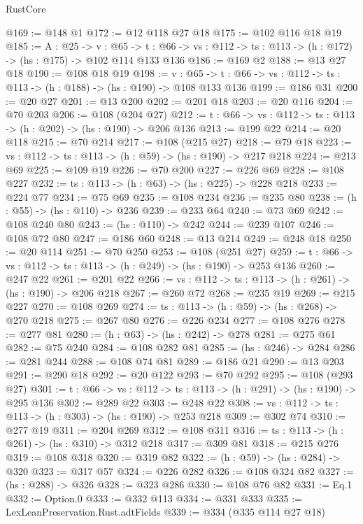 \begin{lexlean}{RustCore}
\begin{coremodule}
@169 := @148 @1
@172 := @12 @118 @27 @18
@175 := @102 @116 @18 @19
@185 := {A : @25} ->
  {v : @65} ->
  {t : @66} -> {vs : @112} -> {ts : @113} -> (h : @172) -> (hs : @175) -> @102 @114 @133 @136
@186 := @169 @2
@188 := @13 @27 @18
@190 := @108 @18 @19
@198 := {v : @65} ->
  {t : @66} -> {vs : @112} -> {ts : @113} -> (h : @188) -> (hs : @190) -> @108 @133 @136
@199 := @186 @31
@200 := @20 @27
@201 := @13 @200
@202 := @201 @18
@203 := @20 @116
@204 := @70 @203
@206 := @108 (@204 @27)
@212 := {t : @66} -> {vs : @112} -> {ts : @113} -> (h : @202) -> (hs : @190) -> @206 @136
@213 := @199 @22
@214 := @20 @118
@215 := @70 @214
@217 := @108 (@215 @27)
@218 := @79 @18
@223 := {vs : @112} -> {ts : @113} -> (h : @59) -> (hs : @190) -> @217 @218
@224 := @213 @69
@225 := @109 @19
@226 := @70 @200
@227 := @226 @69
@228 := @108 @227
@232 := {ts : @113} -> (h : @63) -> (hs : @225) -> @228 @218
@233 := @224 @77
@234 := @75 @69
@235 := @108 @234
@236 := @235 @80
@238 := (h : @55) -> (hs : @110) -> @236
@239 := @233 @64
@240 := @73 @69
@242 := @108 @240 @80
@243 := (hs : @110) -> @242
@244 := @239 @107
@246 := @108 @72 @80
@247 := @186 @60
@248 := @13 @214
@249 := @248 @18
@250 := @20 @114
@251 := @70 @250
@253 := @108 (@251 @27)
@259 := {t : @66} -> {vs : @112} -> {ts : @113} -> (h : @249) -> (hs : @190) -> @253 @136
@260 := @247 @22
@261 := @201 @22
@266 := {vs : @112} -> {ts : @113} -> (h : @261) -> (hs : @190) -> @206 @218
@267 := @260 @72
@268 := @235 @19
@269 := @215 @227
@270 := @108 @269
@274 := {ts : @113} -> (h : @59) -> (hs : @268) -> @270 @218
@275 := @267 @80
@276 := @226 @234
@277 := @108 @276
@278 := @277 @81
@280 := (h : @63) -> (hs : @242) -> @278
@281 := @275 @61
@282 := @75 @240
@284 := @108 @282 @81
@285 := (hs : @246) -> @284
@286 := @281 @244
@288 := @108 @74 @81
@289 := @186 @21
@290 := @13 @203
@291 := @290 @18
@292 := @20 @122
@293 := @70 @292
@295 := @108 (@293 @27)
@301 := {t : @66} -> {vs : @112} -> {ts : @113} -> (h : @291) -> (hs : @190) -> @295 @136
@302 := @289 @22
@303 := @248 @22
@308 := {vs : @112} -> {ts : @113} -> (h : @303) -> (hs : @190) -> @253 @218
@309 := @302 @74
@310 := @277 @19
@311 := @204 @269
@312 := @108 @311
@316 := {ts : @113} -> (h : @261) -> (hs : @310) -> @312 @218
@317 := @309 @81
@318 := @215 @276
@319 := @108 @318
@320 := @319 @82
@322 := (h : @59) -> (hs : @284) -> @320
@323 := @317 @57
@324 := @226 @282
@326 := @108 @324 @82
@327 := (hs : @288) -> @326
@328 := @323 @286
@330 := @108 @76 @82
@331 := Eq.{1}
@332 := Option.{0}
@333 := @332 @113
@334 := @331 @333
@335 := LexLeanPreservation.Rust.adtFields
@339 := @334 (@335 @114 @27 @18)

\end{coremodule}
\end{lexlean}
